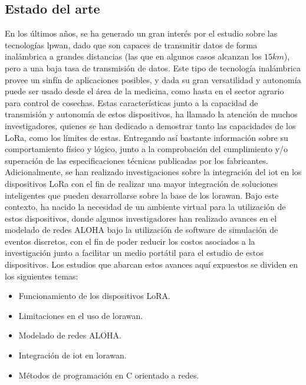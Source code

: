 \begin{justify}
\chapter[Estado del arte]{Estado del arte}
\label{ch:estadodelarte}

En los últimos años, se ha generado un gran interés por el estudio sobre las tecnologías \gls{lpwan}, dado que son capaces de transmitir datos de forma inalámbrica a grandes distancias (las que en algunos casos alcanzan los $15km$), pero a una baja tasa de transmisión de datos. Este tipo de tecnología inalámbrica provee un sinfín de aplicaciones posibles, y dada su gran versatilidad y autonomía puede ser usado desde el área de la medicina, como hasta en el sector agrario para control de cosechas. Estas características junto a la capacidad de transmisión y autonomía de estos dispositivos, ha llamado la atención de muchos investigadores, quienes se han dedicado a demostrar tanto las capacidades de los LoRa, como los límites de estas. Entregando así bastante información sobre su comportamiento físico y lógico, junto a la comprobación del cumplimiento y/o superación de las especificaciones técnicas publicadas por los fabricantes. Adicionalmente, se han realizado investigaciones sobre la integración del \gls{iot} en los dispositivos LoRa con el fin de realizar una mayor integración de soluciones inteligentes que pueden desarrollarse sobre la base de los \gls{lorawan}. Bajo este contexto, ha nacido la necesidad de un ambiente virtual para la utilización de estos dispositivos, donde algunos investigadores han realizado avances en el modelado de redes ALOHA bajo la utilización de software de simulación de eventos discretos, con el fin de poder reducir los costos asociados a la investigación junto a facilitar un medio portátil  para el estudio de estos dispositivos.\newpage \noindent
Los estudios que abarcan estos avances aquí expuestos se dividen en los siguientes temas:
\begin{itemize}
\item Funcionamiento de los dispositivos LoRA.\\
\item Limitaciones en el uso de \gls{lorawan}.\\
\item Modelado de redes ALOHA.\\
\item Integración de \gls{iot} en \gls{lorawan}.\\
\item Métodos de programación en C orientado a redes.\\
\end{itemize} 


\end{justify}
